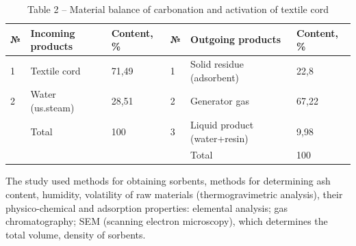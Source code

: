 \begin{table}[H]
\caption*{Table 2 -- Material balance of carbonation and activation of textile cord}
\centering
\begin{tabular}{|lll|l|l|l|}
\hline
\multicolumn{1}{|l|}{№} & \multicolumn{1}{l|}{Incoming products} & Content, \% & № & Outgoing products & Content, \% \\ \hline
\multicolumn{1}{|l|}{1} & \multicolumn{1}{l|}{Textile cord} & 71,49 & 1 & Solid residue (adsorbent) & 22,8 \\ \hline
\multicolumn{1}{|l|}{2} & \multicolumn{1}{l|}{Water (us.steam)} & 28,51 & 2 & Generator gas & 67,22 \\ \hline
\multicolumn{1}{|l|}{} & \multicolumn{1}{l|}{Total} & 100 & 3 & Liquid product (water+resin) & 9,98 \\ \hline
\multicolumn{3}{|l|}{} &  & Total & 100 \\ \hline
\end{tabular}%
\end{table}

\begin{multicols}{2}
The study used methods for obtaining sorbents, methods for determining
ash content, humidity, volatility of raw materials (thermogravimetric
analysis), their physico-chemical and adsorption properties: elemental
analysis; gas chromatography; SEM (scanning electron microscopy), which
determines the total volume, density of sorbents.
\end{multicols}

